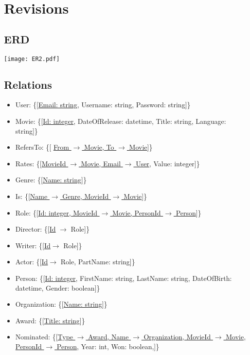 \section{Revisions}

\subsection{ERD}
\texttt{[image: ER2.pdf]}

\subsection{Relations}
\begin{itemize}
\item User: \{[\underline{Email: string}, Username: string, Password: string]\}

\item Movie: \{[\underline{Id: integer}, DateOfRelease: datetime, Title: string, Language: string]\}

\item RefersTo: \{[ \underline{From $\rightarrow$ Movie, To $\rightarrow$ Movie}]\}

\item Rates: \{[\underline{MovieId $\rightarrow$ Movie, Email $ \rightarrow $ User}, Value: integer]\}

\item Genre: \{[\underline{Name: string}]\}

\item Is: \{[\underline{Name $\rightarrow$ Genre, MovieId $\rightarrow$ Movie}]\}

\item Role: \{[\underline{Id: integer, MovieId $\rightarrow$ Movie, PersonId $ \rightarrow $ Person}]\}

\item Director: \{[\underline{Id} $ \rightarrow $ Role]\}

\item Writer: \{[\underline{Id}$ \rightarrow $ Role]\}

\item Actor: \{[\underline{Id}$ \rightarrow $ Role, PartName: string]\}

\item Person: \{[\underline{Id: integer}, FirstName: string, LastName: string, DateOfBirth: datetime, Gender: boolean]\}

\item Organization: \{[\underline{Name: string}]\}

\item Award: \{[\underline{Title: string}]\}

\item Nominated: \{[\underline{Type $ \rightarrow $ Award, Name $ \rightarrow $ Organization, MovieId $\rightarrow$ Movie,}\\
\underline{PersonId $ \rightarrow $ Person}, Year: int, Won: boolean,]\}
\end{itemize}


